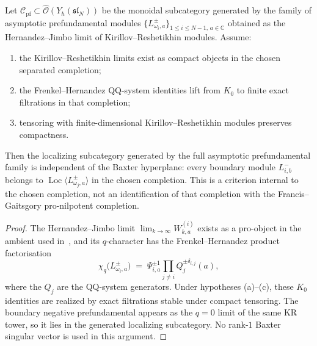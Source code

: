 \begin{proposition}
\label{prop:mc3-asymptotic-prefundamentals-five-family}
Let $\mathcal{C}_{\mathrm{pf}} \subset \widehat{\mathcal{O}}(Y_\hbar(\mathfrak{sl}_N))$
be the monoidal subcategory generated by the family of asymptotic
prefundamental modules $\{L^\pm_{\omega_i, a}\}_{1 \le i \le N-1,\, a \in \mathbb{C}}$
obtained as the Hernandez--Jimbo limit of Kirillov--Reshetikhin modules.
Assume:
\begin{enumerate}[label=\textup{(\alph*)},nosep]
\item the Kirillov--Reshetikhin limits exist as compact objects in
 the chosen separated completion;
\item the Frenkel--Hernandez QQ-system identities lift from
 $K_0$ to finite exact filtrations in that completion;
\item tensoring with finite-dimensional Kirillov--Reshetikhin
 modules preserves compactness.
\end{enumerate}
Then the localizing subcategory generated by the full asymptotic
prefundamental family is independent of the Baxter hyperplane: every
boundary module $L^-_{i,b}$ belongs to
\(\operatorname{Loc}\langle L^\pm_{\omega_j,a}\rangle\) in the chosen
completion. This is a criterion internal to the chosen completion,
not an identification of that completion with the
Francis--Gaitsgory pro-nilpotent completion.
\end{proposition}

\begin{proof}
The Hernandez--Jimbo limit $\lim_{k \to \infty} W^{(i)}_{k,a}$ exists
as a pro-object in the ambient used in~\cite{HJZ25}, and its
$q$-character has the Frenkel--Hernandez product
factorisation~\cite{FrenkelHernandez15}
\[
 \chi_q\!\big(L^\pm_{\omega_i, a}\big) \;=\; \Psi_{i,a}^{\pm 1}
 \prod_{j \neq i} Q_{j}^{\pm \delta_{i,j}}(a),
\]
where the $Q_j$ are the QQ-system generators. Under hypotheses
\textup{(a)--(c)}, these $K_0$ identities are realized by exact
filtrations stable under compact tensoring. The boundary negative
prefundamental appears as the $q=0$ limit of the same KR tower, so it
lies in the generated localizing subcategory. No rank-$1$ Baxter
singular vector is used in this argument.
\end{proof}


